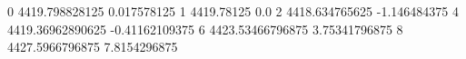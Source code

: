 0 4419.798828125 0.017578125
1 4419.78125 0.0
2 4418.634765625 -1.146484375
4 4419.36962890625 -0.41162109375
6 4423.53466796875 3.75341796875
8 4427.5966796875 7.8154296875
